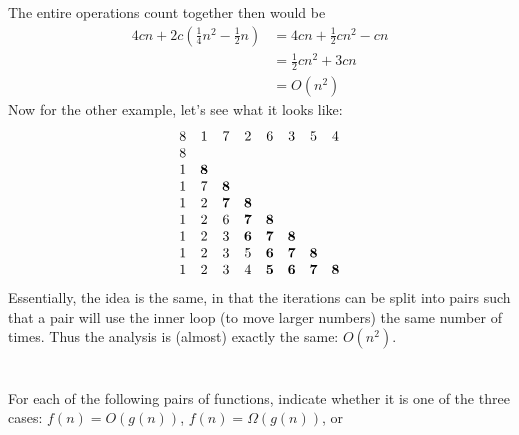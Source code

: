 \documentclass{article}
\begin{document}
\begin{enumerate}[label=(\alph*)]
\begin{equation}
\end{equation}
The entire operations count together then would be
\begin{equation}
  \begin{split}
    4cn + 2c\left(\frac{1}{4}n^2 - \frac{1}{2}n\right)&= 
    4cn + \frac{1}{2}cn^2 - cn\\
    &= \frac{1}{2}cn^2 + 3cn\\
    &= O(n^2)
  \end{split}
\end{equation}
Now for the other example, let's see what it looks like:
\begin{equation}
  \begin{matrix}
    8& 1& 7& 2& 6& 3& 5 &4 \\
    8 &&&&&&&\\
    1 & {\bf 8} &&&&&&\\
    1 & 7 & {\bf 8}&&&&&\\ 
    1 & 2 & {\bf 7} & {\bf 8}&&&&\\
    1 & 2 & 6 & {\bf 7}&{\bf 8}  &&&\\
    1 & 2 & 3 & {\bf 6}& {\bf 7}&{\bf 8}  &&\\
    1 & 2 & 3 & 5& {\bf 6}& {\bf 7}&{\bf 8}  &\\
    1 & 2 & 3 & 4& {\bf 5}  &{\bf 6} & {\bf 7}&{\bf 8} \\
  \end{matrix}
\end{equation}
Essentially, the idea is the same, in that the iterations can be split
into pairs such that a pair will use the inner loop (to move larger
numbers) the same number of times.  Thus the analysis is (almost)
exactly the same: $ O(n^2)$.


\end{enumerate}


\section{}
For each of the following pairs of functions, indicate whether it is
one of the three cases: $f (n) = O(g(n))$, $f (n) = \Omega(g(n))$, or
\end{document}

